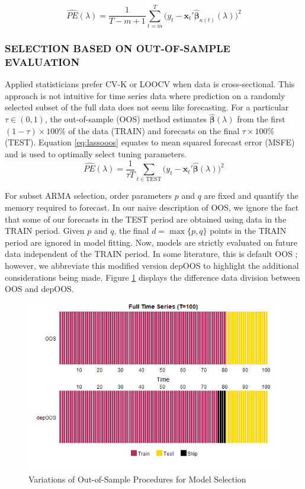 \begin{equation}
\label{eq:lassocvpe}
	\widehat{PE}(\lambda)=\frac{1}{T-m+1}\sum\limits_{t=m}^T \bigg(y_t-\bm{x}_t'\hat{\bm{\beta}}_{\kappa(t)}(\lambda)\bigg)^2
\end{equation}


\subsubsection{SELECTION BASED ON OUT-OF-SAMPLE EVALUATION}

Applied statisticians prefer CV-K or LOOCV when data is cross-sectional. This approach is not intuitive for time series data where prediction on a randomly selected subset of the full data does not seem like forecasting. For a particular $\tau\in (0,1)$, the out-of-sample (OOS) method estimates $\hat{\bm{\beta}}(\lambda)$ from the first $(1-\tau)\times 100\%$ of the data (TRAIN) and forecasts on the final $\tau\times 100\%$ (TEST). Equation 
\ref{eq:lassooos} equates to mean squared forecast error (MSFE) and is used to optimally select tuning parameters. 
\begin{equation}
\label{eq:lassooos}
	\widehat{PE}(\lambda)=\frac{1}{\tau T}\sum\limits_{t\in \textrm{TEST}} \bigg(y_t-\bm{x}_t'\hat{\bm{\beta}}(\lambda)\bigg)^2
\end{equation}

For subset ARMA selection, order parameters $p$ and $q$ are fixed and quantify the memory required to forecast.  In our naive description of OOS, we ignore the fact that some of our forecasts in the TEST period are obtained using data in the TRAIN period. Given $p$ and $q$, the final $d=\max\{p,q\}$ points in the TRAIN period are ignored in model fitting. Now, models are strictly evaluated on future data independent of the TRAIN period. In some literature, this is default OOS \citep{Bergmeir2018}; however, we abbreviate this modified version depOOS to highlight the additional considerations being made. Figure \ref{fig:oosplots} displays the difference data division between OOS and depOOS.

\begin{figure}[htbp!]
	\caption{Variations of Out-of-Sample Procedures for Model Selection}
	\label{fig:oosplots}
	\includegraphics[scale=0.7]{oosplots}
\end{figure}


